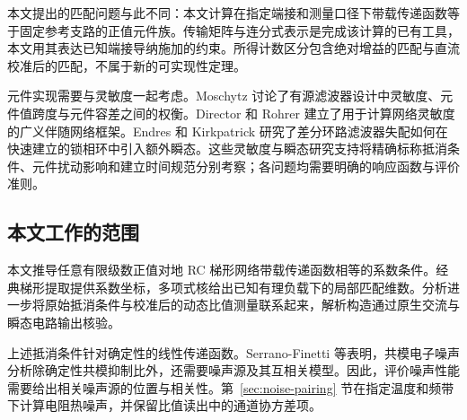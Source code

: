 本文提出的匹配问题与此不同：本文计算在指定端接和测量口径下带载传递函数等于固定参考支路的正值元件族。传输矩阵与连分式表示是完成该计算的已有工具\citep{guillemin1949rcsynthesis,fialkow1951rcladder,lee1978chain}，本文用其表达已知端接导纳施加的约束。所得计数区分包含绝对增益的匹配与直流校准后的匹配，不属于新的可实现性定理。

元件实现需要与灵敏度一起考虑。Moschytz 讨论了有源滤波器设计中灵敏度、元件值跨度与元件容差之间的权衡\citep{moschytz0radeffs}。Director 和 Rohrer 建立了用于计算网络灵敏度的广义伴随网络框架\citep{director1969the}。Endres 和 Kirkpatrick 研究了差分环路滤波器失配如何在快速建立的锁相环中引入额外瞬态\citep{endres0ensitivi}。这些灵敏度与瞬态研究支持将精确标称抵消条件、元件扰动影响和建立时间规范分别考察；各问题均需要明确的响应函数与评价准则。

\subsection{本文工作的范围}
本文推导任意有限级数正值对地 RC 梯形网络带载传递函数相等的系数条件。经典梯形提取提供系数坐标，多项式核给出已知有理负载下的局部匹配维数。分析进一步将原始抵消条件与校准后的动态比值测量联系起来，解析构造通过原生交流与瞬态电路输出核验。

上述抵消条件针对确定性的线性传递函数。Serrano-Finetti 等表明，共模电子噪声分析除确定性共模抑制比外，还需要噪声源及其互相关模型\citep{serranofinetti2019cmnoise}。因此，评价噪声性能需要给出相关噪声源的位置与相关性。第~\ref{sec:noise-pairing} 节在指定温度和频带下计算电阻热噪声，并保留比值读出中的通道协方差项。
